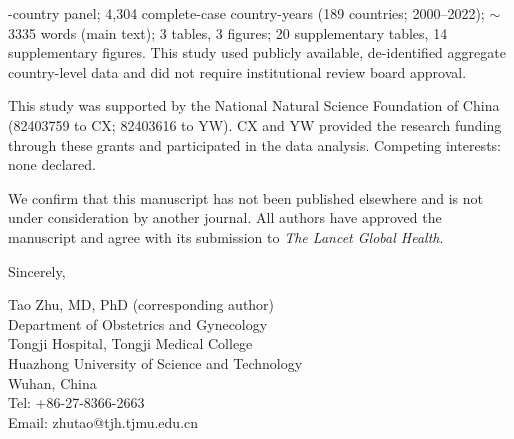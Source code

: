 \documentclass[11pt,a4paper]{article}
\begin{document}
-country panel; 4,304 complete-case country-years (189
countries; 2000--2022); $\sim$3335 words (main text); 3 tables, 3 figures; 20
supplementary tables, 14 supplementary figures. This study used publicly available, de-identified aggregate
country-level data and did not require institutional review board approval.

\noindent This study was supported by the National Natural Science
Foundation of China (82403759 to CX; 82403616 to YW). CX and YW provided
the research funding through these grants and participated in the data
analysis. Competing interests: none declared.

\vspace{12pt}

\noindent We confirm that this manuscript has not been published elsewhere and
is not under consideration by another journal. All authors have approved the
manuscript and agree with its submission to \textit{The Lancet Global Health}.

\vspace{18pt}

\noindent Sincerely,

\vspace{12pt}

\noindent Tao Zhu, MD, PhD (corresponding author)\\
Department of Obstetrics and Gynecology\\
Tongji Hospital, Tongji Medical College\\
Huazhong University of Science and Technology\\
Wuhan, China\\
Tel: +86-27-8366-2663\\
Email: zhutao@tjh.tjmu.edu.cn
\end{document}
